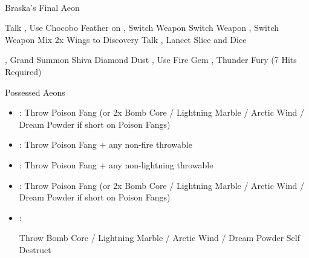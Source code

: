 \vfill\ \colbreak
\begin{battle}[180000]{Braska's Final Aeon}
	\begin{itemize}
		\tidusf Talk
		\switch{\yuna}{\rikku}, Use Chocobo Feather on \tidus
		\switch{\auron}{\yuna}, Switch Weapon
		\rikkuf Switch Weapon
		\switch{\yuna}{\lulu}, Switch Weapon
		\rikkuf Mix 2x Wings to Discovery
		\tidusf Talk
		\switch{\lulu}{\kimahri}, Lancet
		\tidusf Slice and Dice
		
		\vspace{\baselineskip}

		\switch{\rikku}{\yuna}, Grand Summon Shiva
		\shivaf Diamond Dust
		\switch{\kimahri}{\rikku}, Use Fire Gem
		\switch{\tidus}{\lulu}, Thunder Fury (7 Hits Required)
	\end{itemize}
\end{battle}
\colend
{}
\begin{battle}{Possessed  Aeons}
	\begin{itemize}
		\item \valefor : Throw Poison Fang (or 2x Bomb Core / Lightning Marble / Arctic Wind / Dream Powder if short on Poison Fangs)
		\item \ifrit : Throw Poison Fang + any non-fire throwable
		\item \ixilon : Throw Poison Fang + any non-lightning throwable
		\item \shiva : Throw Poison Fang (or 2x Bomb Core / Lightning Marble / Arctic Wind / Dream Powder if short on Poison Fangs)
		\item \bahamut :
			\begin{itemize}
				\rikkuf Throw Bomb Core / Lightning Marble / Arctic Wind / Dream Powder
				\switch{\yuna}{\kimahri}
				\kimahrif Self Destruct
			\end{itemize}
	\end{itemize}
\end{battle}
